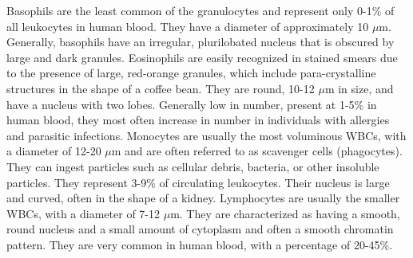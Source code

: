 Basophils are the least common of the granulocytes and represent only 0-1\% of all leukocytes in human blood. They have a diameter of approximately 10 $\mu$m. Generally, basophils have an irregular, plurilobated nucleus that is obscured by large and dark granules. Eosinophils are easily recognized in stained smears due to the presence of large, red-orange granules, which include para-crystalline structures in the shape of a coffee bean. They are round, 10-12 $\mu$m in size, and have a nucleus with two lobes. Generally low in number, present at 1-5\% in human blood, they most often increase in number in individuals with allergies and parasitic infections. Monocytes are usually the most voluminous WBCs, with a diameter of 12-20 $\mu$m and are often referred to as scavenger cells (phagocytes). They can ingest particles such as cellular debris, bacteria, or other insoluble particles. They represent 3-9\% of circulating leukocytes. Their nucleus is large and curved, often in the shape of a kidney. Lymphocytes are usually the smaller WBCs, with a diameter of 7-12 $\mu$m. They are characterized as having a smooth, round nucleus and a small amount of cytoplasm and often a smooth chromatin pattern. They are very common in human blood, with a percentage of 20-45\%. 

